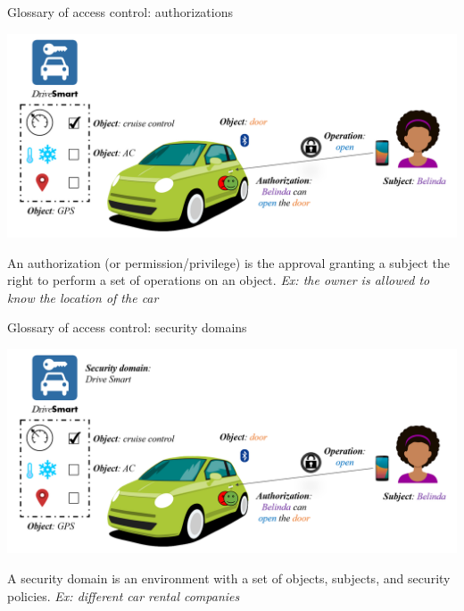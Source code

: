 \begin{frame}{Glossary of access control: authorizations}
    \begin{center}
        \includegraphics[scale=0.33]{Figures/ex_intro_5.png}
    \end{center}
    
    \begin{definition}
        An \alert{authorization} (or permission/privilege) is the approval granting a subject the right to perform a set of operations on an object.
        \newline \emph{Ex: the owner is allowed to know the location of the car}
    \end{definition}
\end{frame}

\begin{frame}{Glossary of access control: security domains}
    \begin{center}
        \includegraphics[scale=0.33]{Figures/ex_intro_6.png}
    \end{center}
    
    \begin{definition}
        A \alert{security domain} is an environment with a set of objects, subjects, and security policies.
        \newline \emph{Ex: different car rental companies}
    \end{definition}
\end{frame}


